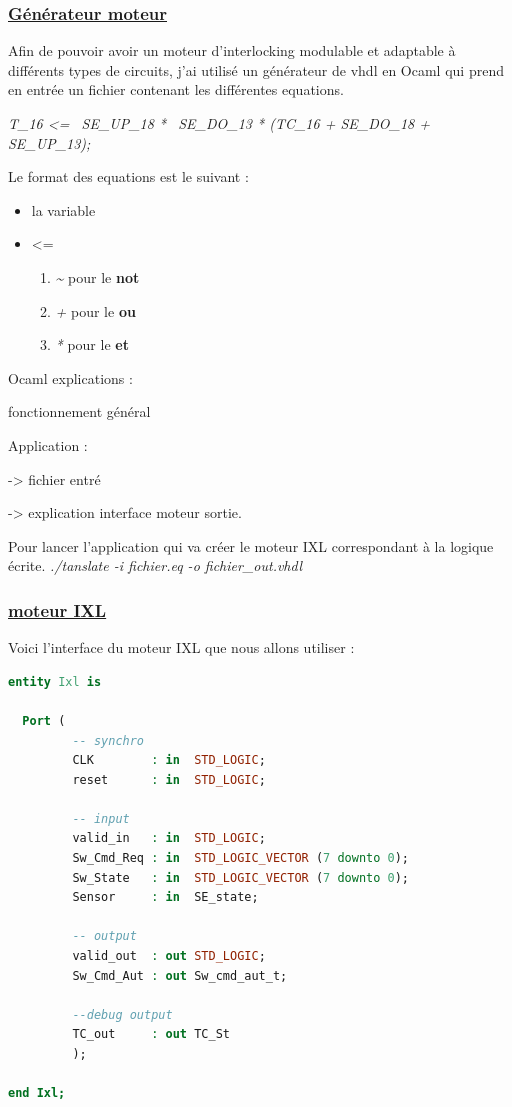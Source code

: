 \subsubsection{\underline{Générateur moteur}}
\label{sec:Générateur}


Afin de pouvoir avoir un moteur d'interlocking modulable et adaptable
à différents types de circuits, j'ai utilisé un générateur de vhdl en
Ocaml qui prend en entrée un fichier contenant les différentes
equations.

\emph{T\_16 <= ~SE\_UP\_18 * ~SE\_DO\_13 * (TC\_16 + SE\_DO\_18 + SE\_UP\_13);}


Le format des equations est le suivant :

\begin{itemize}
  \item la variable
  \item <=
    \begin{enumerate}[->]
    \item \emph{\~} pour le \textbf{not}
    \item \emph{+} pour le \textbf{ou}
    \item \emph{*} pour le \textbf{et}
    \end{enumerate}
\end{itemize}


Ocaml explications :

fonctionnement général

Application :

-> fichier entré

-> explication interface moteur sortie.


Pour lancer l'application qui va créer le moteur IXL correspondant à
la logique écrite.
\emph{./tanslate -i fichier.eq -o fichier\_out.vhdl}

\subsubsection{\underline{moteur IXL}}
\label{sec:IXL}

Voici l'interface du moteur IXL que nous allons utiliser :

\begin{lstlisting}[language=vhdl]
entity Ixl is  

  Port (
         -- synchro   
         CLK        : in  STD_LOGIC;
         reset      : in  STD_LOGIC;

         -- input
         valid_in   : in  STD_LOGIC; 
         Sw_Cmd_Req : in  STD_LOGIC_VECTOR (7 downto 0);
         Sw_State   : in  STD_LOGIC_VECTOR (7 downto 0);
         Sensor     : in  SE_state;
         
         -- output
         valid_out  : out STD_LOGIC;
         Sw_Cmd_Aut : out Sw_cmd_aut_t;

         --debug output
         TC_out     : out TC_St
         );

end Ixl;

\end{lstlisting}


